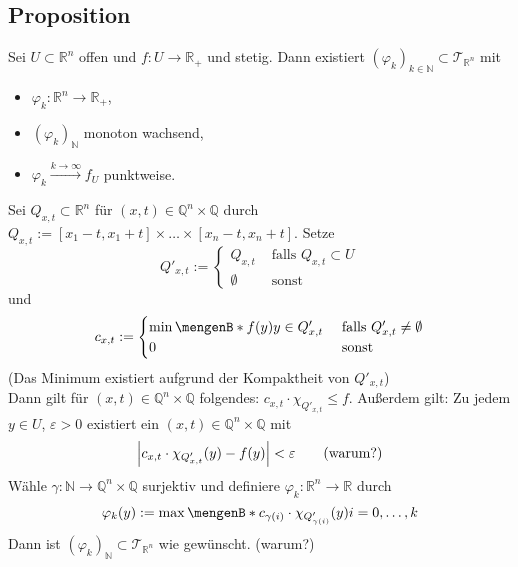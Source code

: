 \subsection[Proposition: Stetige Funktionen lassen sich durch Treppenfunktionen approximieren]{Proposition} %
\label{sub:49}
Sei $U \subset \mathds{R}^n$ offen und $f : U \to \mathds{R}_+$ und stetig. Dann existiert $(\varphi_k)_{k \in \mathds{N}} \subset \mathcal{T}_{\mathds{R}^n}$ mit
\begin{itemize}
	\item $\varphi_k : \mathds{R}^n \to \mathds{R}_+$,
	\item $(\varphi_k)_\mathds{N}$ monoton wachsend,
	\item $\varphi_k \xrightarrow{k \to \infty}  f_U$ punktweise.
\end{itemize}
Sei $Q_{x,t} \subset \mathds{R}^n$ für $(x,t) \in \mathds{Q}^n \times \mathds{Q}$ durch $Q_{x,t} := [x_1 -t, x_1 +t] \times \ldots \times [x_n -t, x_n +t]$. Setze
\[
	Q'_{x,t} := \begin{cases}
		Q_{x,t} &\text{ falls } Q_{x,t} \subset U\\
		\emptyset  &\text{ sonst}
	\end{cases}
\]
und
\[
	c_{x,t} := \begin{cases}
		\min \set[f(y)]{y \in Q'_{x,t}}  &\text{ falls }Q'_{x,t} \not=\emptyset \\
		0 &\text{ sonst}
	\end{cases}
\]
(Das Minimum existiert aufgrund der Kompaktheit von $Q'_{x,t}$)\\
Dann gilt für $(x,t) \in \mathds{Q}^n \times \mathds{Q}$ folgendes: $c_{x,t} \cdot \chi_{Q'_{x,t}} \le f$. Außerdem gilt: Zu jedem $y \in U$, $\varepsilon>0$ existiert ein
$(x,t) \in \mathds{Q}^n \times \mathds{Q}$ mit 
\begin{align*}
	\abs*{c_{x,t} \cdot \chi_{Q'_{x,t}}(y) - f(y)} < \varepsilon \tag{warum?} 
\end{align*}
Wähle $\gamma : \mathds{N} \to \mathds{Q}^n \times \mathds{Q}$ surjektiv und definiere $\varphi_k : \mathds{R}^n \to \mathds{R}$ durch 
\[
	\varphi_k (y) := \max \set[c_{\gamma(i)} \cdot \chi_{Q'_{\gamma(i)}}(y)]{i = 0, \ldots , k} 
\]
Dann ist $(\varphi_k)_\mathds{N} \subset \mathcal{T}_{\mathds{R}^n}$ wie gewünscht. \hfill (warum?)

